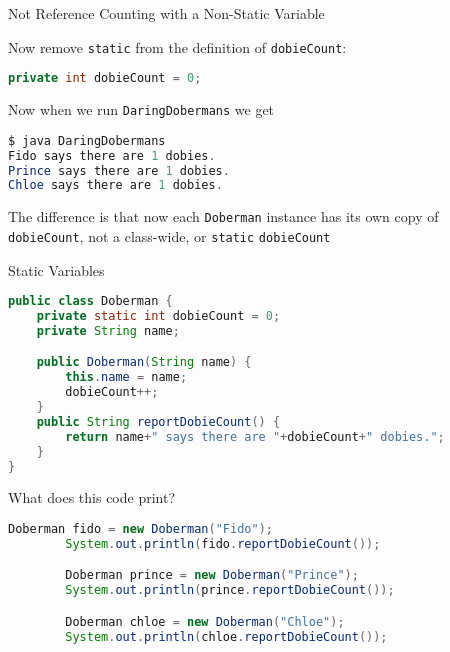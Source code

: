 \documentclass{beamer}
\begin{document}
\begin{frame}[fragile]{Not Reference Counting with a Non-Static Variable}

Now remove {\tt static} from the definition of {\tt dobieCount}:
\begin{lstlisting}[language=Java]
    private int dobieCount = 0;
\end{lstlisting}
Now when we run {\tt DaringDobermans} we get
\begin{lstlisting}[language=Java]
$ java DaringDobermans
Fido says there are 1 dobies.
Prince says there are 1 dobies.
Chloe says there are 1 dobies.
\end{lstlisting}

The difference is that now each {\tt Doberman} instance has its own copy of {\tt dobieCount}, not a class-wide, or {\tt static} {\tt dobieCount}


\end{frame}

\begin{frame}[fragile]{Static Variables}

\vspace{-.05in}
\begin{lstlisting}[language=Java]
public class Doberman {
    private static int dobieCount = 0;
    private String name;

    public Doberman(String name) {
        this.name = name;
        dobieCount++;
    }
    public String reportDobieCount() {
        return name+" says there are "+dobieCount+" dobies.";
    }
}
\end{lstlisting}
\vspace{-.05in}
What does this code print?
\vspace{-.05in}
\begin{lstlisting}[language=Java]
        Doberman fido = new Doberman("Fido");
        System.out.println(fido.reportDobieCount());

        Doberman prince = new Doberman("Prince");
        System.out.println(prince.reportDobieCount());

        Doberman chloe = new Doberman("Chloe");
        System.out.println(chloe.reportDobieCount());
\end{lstlisting}


\end{frame}
\end{document}
